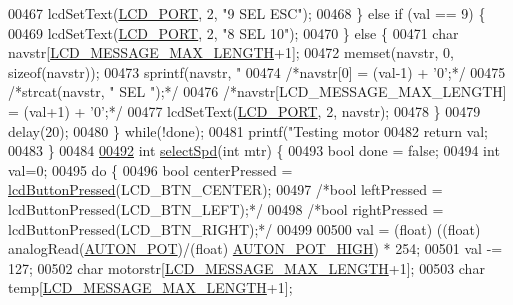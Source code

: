 \begin{DoxyCode}
{{{00467             lcdSetText(\hyperlink{lcdmsg_8h_abcf42bd88b3c36193f301ca25b033875}{LCD\_PORT}, 2, \textcolor{stringliteral}{"9      SEL   ESC"});
00468         \} \textcolor{keywordflow}{else} \textcolor{keywordflow}{if} (val == 9) \{
00469             lcdSetText(\hyperlink{lcdmsg_8h_abcf42bd88b3c36193f301ca25b033875}{LCD\_PORT}, 2, \textcolor{stringliteral}{"8      SEL    10"});
00470         \} \textcolor{keywordflow}{else} \{
00471             \textcolor{keywordtype}{char} navstr[\hyperlink{lcdmsg_8h_abe4c4b70fc6f44ae3680e5b2c68cdd00}{LCD\_MESSAGE\_MAX\_LENGTH}+1];
00472             memset(navstr, 0, \textcolor{keyword}{sizeof}(navstr));
00473             sprintf(navstr, \textcolor{stringliteral}{"%
00474             \textcolor{comment}{/*navstr[0] = (val-1) + '0';*/}
00475             \textcolor{comment}{/*strcat(navstr, "      SEL     ");*/}
00476             \textcolor{comment}{/*navstr[LCD\_MESSAGE\_MAX\_LENGTH] = (val+1) + '0';*/}
00477             lcdSetText(\hyperlink{lcdmsg_8h_abcf42bd88b3c36193f301ca25b033875}{LCD\_PORT}, 2, navstr);
00478         \}
00479         delay(20);
00480     \} \textcolor{keywordflow}{while}(!done);
00481     printf(\textcolor{stringliteral}{"Testing motor %
00482     \textcolor{keywordflow}{return} val;
00483 \}
00484 
\hypertarget{lcddiag_8c_source.tex_l00492}{}\hyperlink{lcddiag_8c_a1f4f4ecd7b0c166456dd26a66e51f813}{00492} \textcolor{keywordtype}{int} \hyperlink{lcddiag_8c_a1f4f4ecd7b0c166456dd26a66e51f813}{selectSpd}(\textcolor{keywordtype}{int} mtr) \{
00493     \textcolor{keywordtype}{bool} done = \textcolor{keyword}{false};
00494     \textcolor{keywordtype}{int} val=0;
00495     \textcolor{keywordflow}{do} \{
00496         \textcolor{keywordtype}{bool} centerPressed = \hyperlink{lcddiag_8h_a74e4c744db49f9b7b645095575e152ad}{lcdButtonPressed}(LCD\_BTN\_CENTER);
00497         \textcolor{comment}{/*bool leftPressed = lcdButtonPressed(LCD\_BTN\_LEFT);*/}
00498         \textcolor{comment}{/*bool rightPressed = lcdButtonPressed(LCD\_BTN\_RIGHT);*/}
00499 
00500         val = (float) ((\textcolor{keywordtype}{float}) analogRead(\hyperlink{autonrecorder_8h_a2490cda7a399f481333af2e5589b74a9}{AUTON\_POT})/(float) 
      \hyperlink{autonrecorder_8h_a01989d89b8bed150d0aacdaef5ccabd3}{AUTON\_POT\_HIGH}) * 254;
00501         val -= 127;
00502         \textcolor{keywordtype}{char} motorstr[\hyperlink{lcdmsg_8h_abe4c4b70fc6f44ae3680e5b2c68cdd00}{LCD\_MESSAGE\_MAX\_LENGTH}+1];
00503         \textcolor{keywordtype}{char} temp[\hyperlink{lcdmsg_8h_abe4c4b70fc6f44ae3680e5b2c68cdd00}{LCD\_MESSAGE\_MAX\_LENGTH}+1];
}}}}}
\end{DoxyCode}
